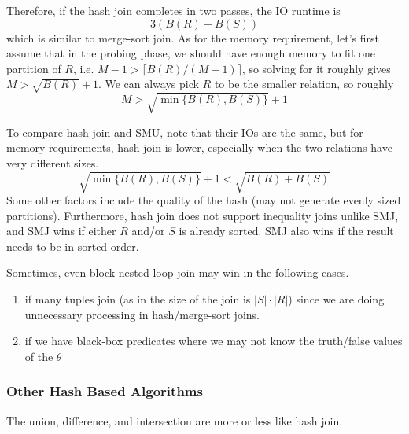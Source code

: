 \documentclass{article}
\begin{document}
\begin{definition}
        Therefore, if the hash join completes in two passes, the IO runtime is 
        \begin{equation}
          3 ( B(R) + B(S)) 
        \end{equation}
        which is similar to merge-sort join. As for the memory requirement, let's first assume that in the probing phase, we should have enough memory to fit one partition of $R$, i.e. $M-1 > \lceil B(R) / (M-1) \rceil$, so solving for it roughly gives $M > \sqrt{B(R)} + 1$. We can always pick $R$ to be the smaller relation, so roughly 
        \begin{equation}
          M > \sqrt{\min\{ B(R), B(S)\}} + 1
        \end{equation}
      \end{definition}

      \begin{theorem}
        To compare hash join and SMU, note that their IOs are the same, but for memory requirements, hash join is lower, especially when the two relations have very different sizes. 
        \begin{equation}
          \sqrt{\min\{B(R), B(S)\}} + 1 < \sqrt{B(R) + B(S)}
        \end{equation}
        Some other factors include the quality of the hash (may not generate evenly sized partitions). Furthermore, hash join does not support inequality joins unlike SMJ, and SMJ wins if either $R$ and/or $S$ is already sorted. SMJ also wins if the result needs to be in sorted order. 
      \end{theorem}

      Sometimes, even block nested loop join may win in the following cases. 
      \begin{enumerate}
        \item if many tuples join (as in the size of the join is $|S| \cdot |R|$) since we are doing unnecessary processing in hash/merge-sort joins. 
        \item if we have black-box predicates where we may not know the truth/false values of the $\theta$
      \end{enumerate}

    \subsubsection{Other Hash Based Algorithms}

      The union, difference, and intersection are more or less like hash join. 
\end{document}
